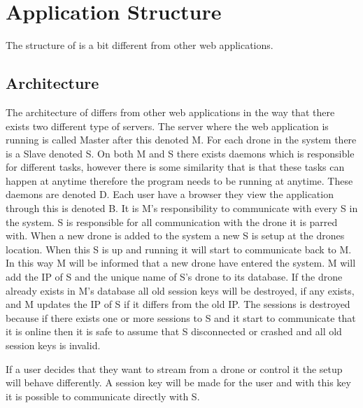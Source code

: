 \section{Application Structure}

The structure of \projectname{} is a bit different from other web applications.

\subsection{Architecture}

The architecture of \projectname{} differs from other web applications in the way that there exists two different type of servers. The server where the web application is running is called Master after this denoted M.
For each drone in the system there is a Slave denoted S. 
On both M and S there exists daemons which is responsible for different tasks, however there is some similarity that is that these tasks can happen at anytime therefore the program needs to be running at anytime. These daemons are denoted D.
Each user have a browser they view the application through this is denoted B.
It is M's responsibility to communicate with every S in the system.
S is responsible for all communication with the drone it is parred with.
When a new drone is added to the system a new S is setup at the drones location. When this S is up and running it will start to communicate back to M. In this way M will be informed that a new drone have entered the system. M will add the IP of S and the unique name of S's drone to its database.
If the drone already exists in M's database all old session keys will be destroyed, if any exists, and M updates the IP of S if it differs from the old IP. The sessions is destroyed because if there exists one or more sessions to S and it start to communicate that it is online then it is safe to assume that S disconnected or crashed and all old session keys is invalid.

If a user decides that they want to stream from a drone or control it the setup will behave differently. A session key will be made for the user and with this key it is possible to communicate directly with S.

